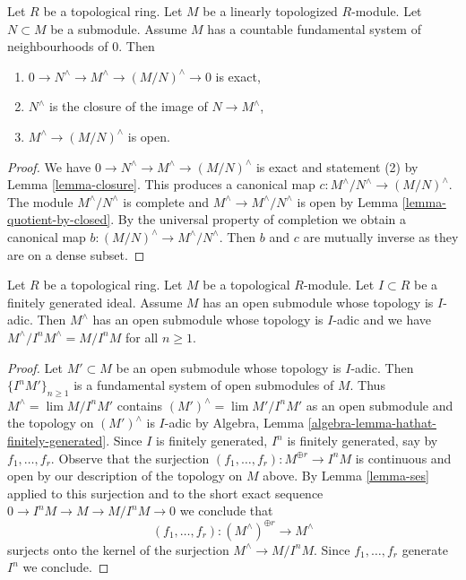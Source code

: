 \begin{lemma}
\label{lemma-ses}
\begin{reference}
\cite[Theorem 8.1]{Ma}
\end{reference}
Let $R$ be a topological ring. Let $M$ be a linearly topologized
$R$-module. Let $N \subset M$ be a submodule. Assume $M$ has a
countable fundamental system of neighbourhoods of $0$. Then
\begin{enumerate}
\item $0 \to N^\wedge \to M^\wedge \to (M/N)^\wedge \to 0$ is exact,
\item $N^\wedge$ is the closure of the image of $N \to M^\wedge$,
\item $M^\wedge \to (M/N)^\wedge$ is open.
\end{enumerate}
\end{lemma}

\begin{proof}
We have $0 \to N^\wedge \to M^\wedge \to (M/N)^\wedge$ is exact
and statement (2) by Lemma \ref{lemma-closure}.
This produces a canonical map $c : M^\wedge/N^\wedge \to (M/N)^\wedge$.
The module $M^\wedge/N^\wedge$ is complete and
$M^\wedge \to M^\wedge/N^\wedge$ is open by
Lemma \ref{lemma-quotient-by-closed}.
By the universal property of completion we obtain a canonical
map $b : (M/N)^\wedge \to M^\wedge/N^\wedge$.
Then $b$ and $c$ are mutually inverse as they are on a dense subset.
\end{proof}

\begin{lemma}
\label{lemma-completion-adic-star}
Let $R$ be a topological ring. Let $M$ be a topological $R$-module.
Let $I \subset R$ be a finitely generated ideal. Assume $M$
has an open submodule whose topology is $I$-adic. Then $M^\wedge$
has an open submodule whose topology is $I$-adic and we have
$M^\wedge/I^n M^\wedge = M/I^nM$ for all $n \geq 1$.
\end{lemma}

\begin{proof}
Let $M' \subset M$ be an open submodule whose topology is $I$-adic.
Then $\{I^nM'\}_{n \geq 1}$ is a fundamental system of open submodules
of $M$. Thus $M^\wedge = \lim M/I^nM'$ contains
$(M')^\wedge = \lim M'/I^nM'$
as an open submodule and the topology on $(M')^\wedge$ is
$I$-adic by Algebra, Lemma \ref{algebra-lemma-hathat-finitely-generated}.
Since $I$ is finitely generated, $I^n$ is finitely generated,
say by $f_1, \ldots, f_r$. Observe that the surjection
$(f_1, \ldots, f_r) : M^{\oplus r} \to I^n M$ is continuous
and open by our description of the topology on $M$ above.
By Lemma \ref{lemma-ses} applied to this surjection and to the
short exact sequence $0 \to I^nM \to M \to M/I^nM \to 0$
we conclude that
$$
(f_1, \ldots, f_r) :
(M^\wedge)^{\oplus r} \longrightarrow M^\wedge
$$
surjects onto the kernel of the surjection $M^\wedge \to M/I^nM$.
Since $f_1, \ldots, f_r$ generate $I^n$ we conclude.
\end{proof}

